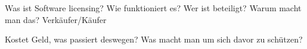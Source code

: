 Was ist Software licensing?
Wie funktioniert es?
Wer ist beteiligt?
Warum macht man das? Verkäufer/Käufer

Kostet Geld, was passiert deswegen?
Was macht man um sich davor zu schützen?




%

%

%
%

%
%



